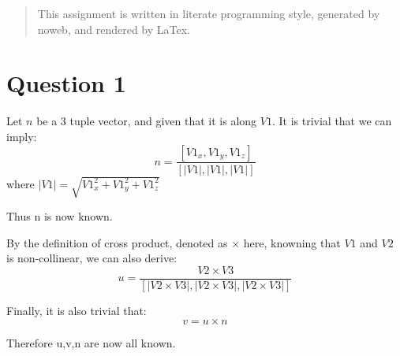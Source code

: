\documentclass[12pt]{article}
\begin{document}
\maketitle

\begin{abstract}
  This assignment is written in literate programming style, generated by noweb, and rendered by LaTex.
\end{abstract}

\section{Question 1}
Let $n$ be a 3 tuple vector, and given that it is along $V1$. It is trivial that  we can imply:
\[
        n = \frac{[V1_x, V1_y, V1_z]}{[|V1|,|V1|,|V1|]}
\]
where $|V1| = \sqrt{V1_x^2+V1_y^2+V1_z^2}$

Thus n is now known.

By the definition of cross product, denoted as $\times$ here, knowning that $V1$ and $V2$ is non-collinear, we can also derive:
\[
        u = \frac{V2 \times V3}{[|V2 \times V3|,|V2 \times V3|,|V2 \times V3|]}
\]

Finally, it is also trivial that:
\[
        v = u \times n
\]

Therefore u,v,n are now all known.
\end{document}
